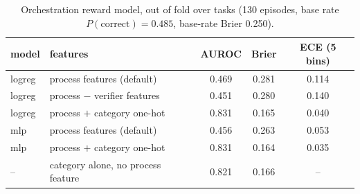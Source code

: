\documentclass[10pt]{article}
\begin{document}
\begin{table}[htbp]
\centering\small
\caption{Orchestration reward model, out of fold over tasks (130 episodes, base rate $P(\text{correct})=0.485$, base-rate Brier 0.250).}
\label{tab:orm}
\begin{tabular}{llccc}
\toprule
model & features & AUROC & Brier & ECE (5 bins) \\
\midrule
logreg & process features (default) & 0.469 & 0.281 & 0.114 \\
logreg & process $-$ verifier features & 0.451 & 0.280 & 0.140 \\
logreg & process $+$ category one-hot & 0.831 & 0.165 & 0.040 \\
mlp & process features (default) & 0.456 & 0.263 & 0.053 \\
mlp & process $+$ category one-hot & 0.831 & 0.164 & 0.035 \\
-- & category alone, no process feature & 0.821 & 0.166 & -- \\
\bottomrule
\end{tabular}
\end{table}
\end{document}
